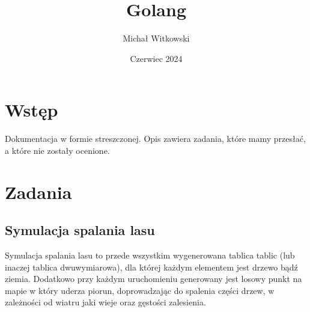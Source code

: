 \documentclass{article}
\title{Golang}
\author{Michał Witkowski}
\date{Czerwiec 2024}
\begin{document}
\maketitle

\section{Wstęp}

\vspace{1em}

Dokumentacja w formie streszczonej. Opis zawiera zadania, które mamy przesłać, a które nie zostały ocenione.


\section{Zadania}

\subsection{Symulacja spalania lasu}

Symulacja spalania lasu to przede wszystkim wygenerowana tablica tablic (lub inaczej tablica dwuwymiarowa), dla której każdym elementem jest drzewo bądź ziemia. Dodatkowo przy każdym uruchomieniu generowany jest losowy punkt na mapie w który uderza piorun, doprowadzając do spalenia części drzew, w zależności od wiatru jaki wieje oraz gęstości zalesienia.

\vspace{2em}

\end{document}
